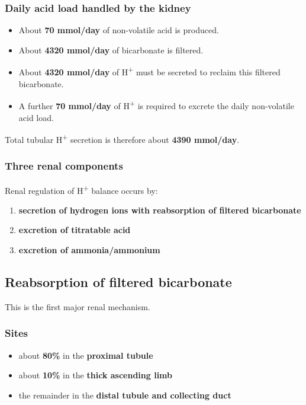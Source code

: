 \documentclass[11pt,a4paper]{article}
\begin{document}
\subsubsection{Daily acid load handled by the kidney}

\begin{itemize}
  \item About \textbf{70 mmol/day} of non-volatile acid is produced.
  \item About \textbf{4320 mmol/day} of bicarbonate is filtered.
  \item About \textbf{4320 mmol/day} of H\textsuperscript{+} must be secreted to reclaim this filtered bicarbonate.
  \item A further \textbf{70 mmol/day} of H\textsuperscript{+} is required to excrete the daily non-volatile acid load.
\end{itemize}

Total tubular H\textsuperscript{+} secretion is therefore about \textbf{4390 mmol/day}.

\subsubsection{Three renal components}

Renal regulation of H\textsuperscript{+} balance occurs by:
\begin{enumerate}
  \item \textbf{secretion of hydrogen ions with reabsorption of filtered bicarbonate}
  \item \textbf{excretion of titratable acid}
  \item \textbf{excretion of ammonia/ammonium}
\end{enumerate}

\subsection{Reabsorption of filtered bicarbonate}

This is the first major renal mechanism.

\subsubsection{Sites}

\begin{itemize}
  \item about \textbf{80\%} in the \textbf{proximal tubule}
  \item about \textbf{10\%} in the \textbf{thick ascending limb}
  \item the remainder in the \textbf{distal tubule and collecting duct}
\end{itemize}
\end{document}
